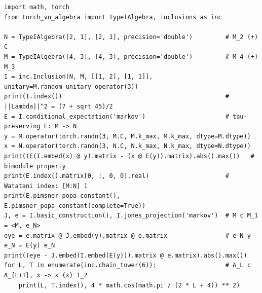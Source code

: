 \documentclass[11pt]{article}
\begin{document}
\begin{lstlisting}[caption={Inclusions, conditional expectations and indices (abridged from \texttt{example\_inclusions.py} in \texttt{examples}).},label=lst:inclusions]
import math, torch
from torch_vn_algebra import TypeIAlgebra, inclusions as inc

N = TypeIAlgebra([2, 1], [2, 1], precision='double')         # M_2 (+) C
M = TypeIAlgebra([4, 3], [4, 3], precision='double')         # M_4 (+) M_3
I = inc.Inclusion(N, M, [[1, 2], [1, 1]], unitary=M.random_unitary_operator(3))
print(I.index())                                             # ||Lambda||^2 = (7 + sqrt 45)/2
E = I.conditional_expectation('markov')                      # tau-preserving E: M -> N
y = M.operator(torch.randn(3, M.C, M.k_max, M.k_max, dtype=M.dtype))
x = N.operator(torch.randn(3, N.C, N.k_max, N.k_max, dtype=N.dtype))
print((E(I.embed(x) @ y).matrix - (x @ E(y)).matrix).abs().max())   # bimodule property
print(E.index().matrix[0, :, 0, 0].real)                     # Watatani index: [M:N] 1
print(E.pimsner_popa_constant(), E.pimsner_popa_constant(complete=True))
J, e = I.basic_construction(), I.jones_projection('markov')  # M c M_1 = <M, e_N>
eye = e.matrix @ J.embed(y).matrix @ e.matrix                # e_N y e_N = E(y) e_N
print((eye - J.embed(I.embed(E(y))).matrix @ e.matrix).abs().max())
for L, T in enumerate(inc.chain_tower(6)):                   # A_L c A_{L+1}, x -> x (x) 1_2
    print(L, T.index(), 4 * math.cos(math.pi / (2 * L + 4)) ** 2)
\end{lstlisting}
\end{document}
